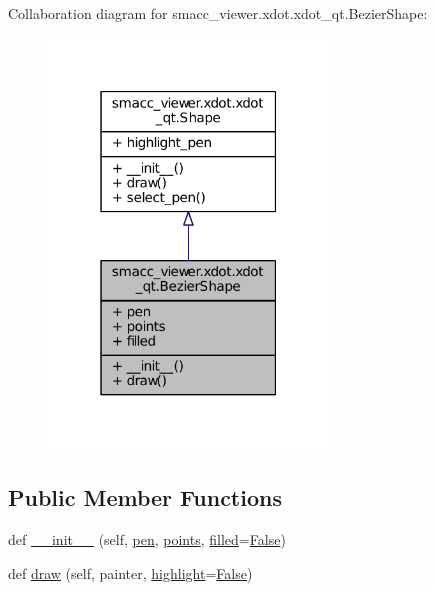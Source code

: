 Collaboration diagram for smacc\+\_\+viewer.\+xdot.\+xdot\+\_\+qt.\+Bezier\+Shape\+:
\nopagebreak
\begin{figure}[H]
\begin{center}
\leavevmode
\includegraphics[width=211pt]{classsmacc__viewer_1_1xdot_1_1xdot__qt_1_1BezierShape__coll__graph}
\end{center}
\end{figure}
\subsection*{Public Member Functions}
\begin{DoxyCompactItemize}
\item 
def \hyperlink{classsmacc__viewer_1_1xdot_1_1xdot__qt_1_1BezierShape_afd621faf1171503b0b2b19a527381682}{\+\_\+\+\_\+init\+\_\+\+\_\+} (self, \hyperlink{classsmacc__viewer_1_1xdot_1_1xdot__qt_1_1BezierShape_ab13d4ab5182465581ca140221340a8dc}{pen}, \hyperlink{classsmacc__viewer_1_1xdot_1_1xdot__qt_1_1BezierShape_a4f82fc0dc7fc27b2196829a68289ca37}{points}, \hyperlink{classsmacc__viewer_1_1xdot_1_1xdot__qt_1_1BezierShape_a57fa45fe41f604d87ceabde0bb904b91}{filled}=\hyperlink{namespacesmacc__viewer_a5928e8da279785cbab9011356c3eaa87}{False})
\item 
def \hyperlink{classsmacc__viewer_1_1xdot_1_1xdot__qt_1_1BezierShape_a19dbc35eb56d0a2fec2a74295d9a0c93}{draw} (self, painter, \hyperlink{namespacesmacc__viewer_1_1xdot_1_1xdot__qt_ab7970f10809cac5c23ebf9c6badb6d79}{highlight}=\hyperlink{namespacesmacc__viewer_a5928e8da279785cbab9011356c3eaa87}{False})
\end{DoxyCompactItemize}
